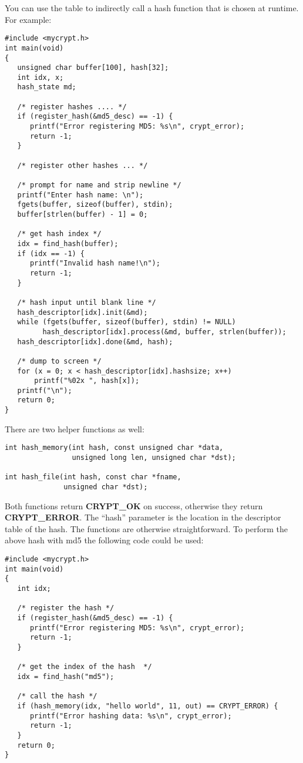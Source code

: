 \documentclass{book}
\begin{document}
You can use the table to indirectly call a hash function that is chosen at runtime.  For example:
\begin{small}
\begin{verbatim}
#include <mycrypt.h>
int main(void)
{
   unsigned char buffer[100], hash[32];
   int idx, x;
   hash_state md;

   /* register hashes .... */
   if (register_hash(&md5_desc) == -1) {
      printf("Error registering MD5: %s\n", crypt_error);
      return -1;
   }

   /* register other hashes ... */

   /* prompt for name and strip newline */
   printf("Enter hash name: \n");
   fgets(buffer, sizeof(buffer), stdin);
   buffer[strlen(buffer) - 1] = 0;

   /* get hash index */
   idx = find_hash(buffer);
   if (idx == -1) {
      printf("Invalid hash name!\n");
      return -1;
   }

   /* hash input until blank line */
   hash_descriptor[idx].init(&md);
   while (fgets(buffer, sizeof(buffer), stdin) != NULL)
         hash_descriptor[idx].process(&md, buffer, strlen(buffer));
   hash_descriptor[idx].done(&md, hash);

   /* dump to screen */
   for (x = 0; x < hash_descriptor[idx].hashsize; x++)
       printf("%02x ", hash[x]);
   printf("\n");
   return 0;
}
\end{verbatim}
\end{small}

There are two helper functions as well:
 
\begin{verbatim}
int hash_memory(int hash, const unsigned char *data, 
                unsigned long len, unsigned char *dst);

int hash_file(int hash, const char *fname, 
              unsigned char *dst);
\end{verbatim}

Both functions return {\bf CRYPT\_OK} on success, otherwise they return {\bf CRYPT\_ERROR}.  The ``hash'' parameter is
the location in the descriptor table of the hash.  The functions are otherwise straightforward.  To perform the above 
hash with md5 the following code could be used:
\begin{small}
\begin{verbatim}
#include <mycrypt.h>
int main(void)
{
   int idx;

   /* register the hash */
   if (register_hash(&md5_desc) == -1) {
      printf("Error registering MD5: %s\n", crypt_error);
      return -1;
   }

   /* get the index of the hash  */
   idx = find_hash("md5");

   /* call the hash */
   if (hash_memory(idx, "hello world", 11, out) == CRYPT_ERROR) {
      printf("Error hashing data: %s\n", crypt_error);
      return -1;
   }
   return 0;
}
\end{verbatim}
\end{small}
\end{document}
